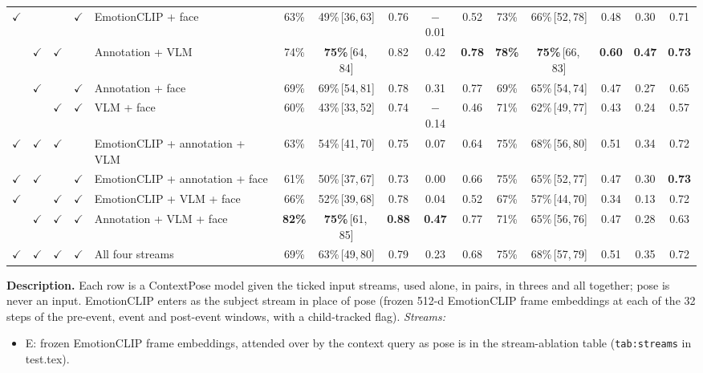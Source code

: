 \documentclass[11pt]{article}
\newcommand{\code}[1]{\texttt{#1}}
\newcommand{\best}[1]{\textbf{#1}}
\newcommand{\ci}[2]{\,[#1,\,#2]}
\newcommand{\tabledesc}[1]{\par\medskip\begin{minipage}{\linewidth}\footnotesize\textbf{Description.} #1\end{minipage}}
\begin{document}
\begin{table}[!htbp]
{\begin{tabular}{cccclcccccccccc}
$\checkmark$ &  &  & $\checkmark$ & EmotionCLIP + face & 63\% & 49\%\ci{36}{63} & 0.76 & $-$0.01 & 0.52 & 73\% & 66\%\ci{52}{78} & 0.48 & 0.30 & 0.71 \\
 & $\checkmark$ & $\checkmark$ &  & Annotation + VLM & 74\% & \best{75\%}\ci{64}{84} & 0.82 & 0.42 & \best{0.78} & \best{78\%} & \best{75\%}\ci{66}{83} & \best{0.60} & \best{0.47} & \best{0.73} \\
 & $\checkmark$ &  & $\checkmark$ & Annotation + face & 69\% & 69\%\ci{54}{81} & 0.78 & 0.31 & 0.77 & 69\% & 65\%\ci{54}{74} & 0.47 & 0.27 & 0.65 \\
 &  & $\checkmark$ & $\checkmark$ & VLM + face & 60\% & 43\%\ci{33}{52} & 0.74 & $-$0.14 & 0.46 & 71\% & 62\%\ci{49}{77} & 0.43 & 0.24 & 0.57 \\
\midrule
$\checkmark$ & $\checkmark$ & $\checkmark$ &  & EmotionCLIP + annotation + VLM & 63\% & 54\%\ci{41}{70} & 0.75 & 0.07 & 0.64 & 75\% & 68\%\ci{56}{80} & 0.51 & 0.34 & 0.72 \\
$\checkmark$ & $\checkmark$ &  & $\checkmark$ & EmotionCLIP + annotation + face & 61\% & 50\%\ci{37}{67} & 0.73 & 0.00 & 0.66 & 75\% & 65\%\ci{52}{77} & 0.47 & 0.30 & \best{0.73} \\
$\checkmark$ &  & $\checkmark$ & $\checkmark$ & EmotionCLIP + VLM + face & 66\% & 52\%\ci{39}{68} & 0.78 & 0.04 & 0.52 & 67\% & 57\%\ci{44}{70} & 0.34 & 0.13 & 0.72 \\
 & $\checkmark$ & $\checkmark$ & $\checkmark$ & Annotation + VLM + face & \best{82\%} & \best{75\%}\ci{61}{85} & \best{0.88} & \best{0.47} & 0.77 & 71\% & 65\%\ci{56}{76} & 0.47 & 0.28 & 0.63 \\
\midrule
$\checkmark$ & $\checkmark$ & $\checkmark$ & $\checkmark$ & All four streams & 69\% & 63\%\ci{49}{80} & 0.79 & 0.23 & 0.68 & 75\% & 68\%\ci{57}{79} & 0.51 & 0.35 & 0.72 \\
\bottomrule
\end{tabular}%
}
\tabledesc{Each row is a ContextPose model given the ticked input streams, used alone, in pairs, in threes and all together; pose is never an input. EmotionCLIP enters as the subject stream in place of pose (frozen 512-d EmotionCLIP frame embeddings at each of the 32 steps of the pre-event, event and post-event windows, with a child-tracked flag).
\emph{Streams:}
\begin{itemize}
  \item E: frozen EmotionCLIP frame embeddings, attended over by the context query as pose is in the stream-ablation table (\code{tab:streams} in test.tex).

\end{itemize}}
\end{table}
\end{document}

